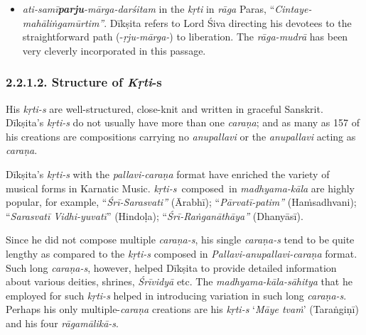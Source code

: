 \begin{itemize}
 \item \textit{ati-samī\textbf{parju}-mārga-darśitam} in the \textit{kṛti} in \textit{rāga} Paras, “\textit{Cintaye-mahāliṅgamūrtim”}. Dīkṣita refers to Lord Śiva directing his devotees to the straightforward path (-\textit{ṛju-mārga-}) to liberation. The \textit{rāga-mudrā} has been very cleverly incorporated in this passage.

\end{itemize}


\subsubsection*{2.2.1.2. Structure of \textit{Kṛti}-s}

His \textit{kṛti-s} are well-structured, close-knit and written in graceful Sanskrit. Dīkṣita’s \textit{kṛti-s} do not usually have more than one \textit{caraṇa}; and as many as 157 of his creations are compositions carrying no \textit{anupallavi} or the \textit{anupallavi} acting as \textit{caraṇa}.

Dīkṣita’s \textit{kṛti-s} with the \textit{pallavi-caraṇa} format have enriched the variety of musical forms in Karnatic Music. \textit{kṛti-s}~composed~in \textit{madhyama-kāla} are highly popular, for example, “\textit{Śrī-Sarasvati”} (Ārabhī); “\textit{Pārvatī-patim”} (Haṁsadhvani); “\textit{Sarasvatī Vidhi-yuvatī}” (Hindoḷa); “\textit{Śrī-Raṅganāthāya”} (Dhanyāsī).

Since he did not compose multiple \textit{caraṇa-s}, his single \textit{caraṇa-s} tend to be quite lengthy as compared to the \textit{kṛti-s} composed in \textit{Pallavi-anupallavi-caraṇa} format. Such long \textit{caraṇa-s}, however, helped Dīkṣita to provide detailed information about various deities, shrines, \textit{Śrīvidyā} etc. The \textit{madhyama-kāla-sāhitya} that he employed for such \textit{kṛti-s} helped in introducing variation in such long \textit{caraṇa-s}. Perhaps his only multiple-\textit{caraṇa} creations are his \textit{kṛti-s} ‘\textit{Māye tvaṁ}’ (Taraṅgiṇī) and his four \textit{rāgamālikā-s}.

